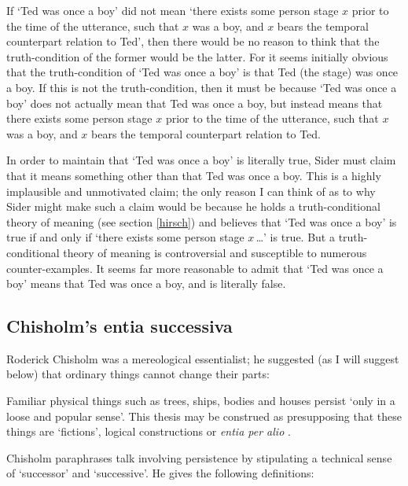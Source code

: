 \documentclass[11pt]{article}
\newenvironment{squote}{%
\begin{spacing}{1}
\begin{list}{}{%
\setlength{\labelwidth}{0pt}%
\rightmargin\leftmargin%
}
\item\relax
}{%
\end{list}%
\end{spacing}
}
\begin{document}
\begin{spacing}{1.5}
If `Ted was once a boy' did not mean `there exists some person stage
$x$ prior to the time of the utterance, such that $x$ was a boy, and
$x$ bears the temporal counterpart relation to Ted', then there would
be no reason to think that the truth-condition of the former would be
the latter.  For it seems initially obvious that the truth-condition of
`Ted was once a boy' is that Ted (the stage) was once a boy.  If this
is not the truth-condition, then it must be because `Ted was once a
boy' does not actually mean that Ted was once a boy, but instead means
that there exists some person stage $x$ prior to the time of the
utterance, such that $x$ was a boy, and $x$ bears the temporal
counterpart relation to Ted.

In order to maintain that `Ted was once a boy' is literally true,
Sider must claim that it means something other than that Ted was once
a boy.  This is a highly implausible and unmotivated claim; the only
reason I can think of as to why Sider might make such a claim would be
because he holds a truth-conditional theory of meaning (see section
\ref{hirsch}) and believes that `Ted was once a boy' is true if and
only if `there exists some person stage $x$\,\ldots ' is true.  But a
truth-conditional theory of meaning is controversial and susceptible
to numerous counter-examples.  It seems far more reasonable to admit
that `Ted was once a boy' means that Ted was once a boy, and is
literally false.

\subsection{Chisholm's entia successiva}
\label{chisholm}
Roderick Chisholm was a mereological essentialist; he suggested (as I
will suggest below) that ordinary things cannot change their parts:

\begin{squote}
Familiar physical things such as trees, ships, bodies and houses
persist `only in a loose and popular sense'.  This thesis may be
construed as presupposing that these things are `fictions', logical
constructions or {\em entia per alio} \citeyearpar[97]{chisholm1979}.
\end{squote}

Chisholm paraphrases talk involving persistence by stipulating a
technical sense of `successor' and `successive'.  He gives the
following definitions:


\end{spacing}
\end{document}
